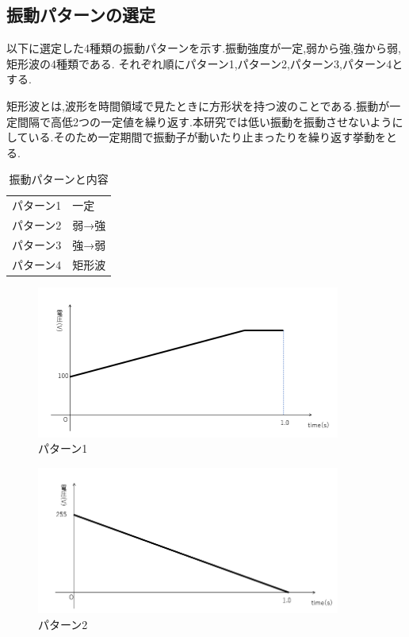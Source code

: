 \newpage
\subsection{振動パターンの選定}
以下に選定した4種類の振動パターンを示す.振動強度が一定,弱から強,強から弱,矩形波の4種類である.
それぞれ順にパターン1,パターン2,パターン3,パターン4とする.

矩形波とは,波形を時間領域で見たときに方形状を持つ波のことである.振動が一定間隔で高低2つの一定値を繰り返す.本研究では低い振動を振動させないようにしている.そのため一定期間で振動子が動いたり止まったりを繰り返す挙動をとる.

\begin{table}[H]
    \caption{\label{tab;sindou}振動パターンと内容}
    \centering
    \begin{tabular}{l|l}
    \hline
    \hline
    パターン1 & 一定\\
    パターン2 & 弱→強\\
    パターン3 & 強→弱\\
    パターン4 &  矩形波\\
    \hline
    \end{tabular}
\end{table}


\begin{figure}[h]
\centering
\includegraphics[clip,width=10cm]{./fig/patarn1.png}
\caption{パターン1}\label{patarn1}
\end{figure}

\begin{figure}[h]
\centering
\includegraphics[clip,width=10cm]{./fig/patarn2.png}
\caption{パターン2}\label{patarn2}
\end{figure}

